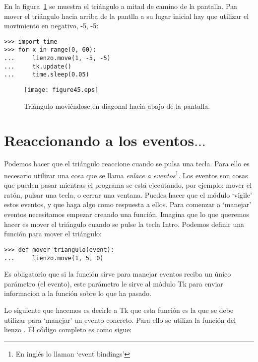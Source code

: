 En la figura~\ref{fig45} se muestra el triángulo a mitad de camino de la pantalla. Paa mover el triángulo hacia arriba de la pantlla a su lugar inicial hay que utilizar el movimiento en negativo, -5, -5:

\begin{listing}
\begin{verbatim}
>>> import time
>>> for x in range(0, 60):
...     lienzo.move(1, -5, -5)
...     tk.update()
...     time.sleep(0.05)
\end{verbatim}
\end{listing}

\begin{figure}
\begin{center}
\texttt{[image: figure45.eps]}
\end{center}
\caption{Triángulo moviéndose en diagonal hacia abajo de la pantalla.}\label{fig45}
\end{figure}

\section{Reaccionando a los eventos$\ldots$}

Podemos hacer que el triángulo reaccione cuando se pulsa una tecla. Para ello es necesario utilizar una cosa que se llama \emph{enlace a eventos}\footnote{En inglés lo llaman `event bindings'}.  Los eventos son cosas que pueden pasar mientras el programa se está ejecutando, por ejemplo: mover el ratón, pulsar una tecla, o cerrar una ventana. Puedes hacer que el módulo  `vigile' estos eventos, y que haga algo como respuesta a ellos.  Para comenzar a `manejar' eventos necesitamos empezar creando una función.  Imagina que lo que queremos hacer es mover el triángulo cuando se pulse la tecla Intro. Podemos definir una función para mover el triángulo:

\begin{listing}
\begin{verbatim}
>>> def mover_triangulo(event):
...     lienzo.move(1, 5, 0)
\end{verbatim}
\end{listing}

Es obligatorio que si la función sirve para manejar eventos reciba un único parámetro (el evento), este parámetro le sirve al módulo Tk para enviar informacion a la función sobre lo que ha pasado.

Lo siguiente que hacemos es decirle a Tk que esta función es la que se debe utilizar para `manejar' un evento concreto. Para ello se utiliza la función del lienzo . El código completo es como sigue:

